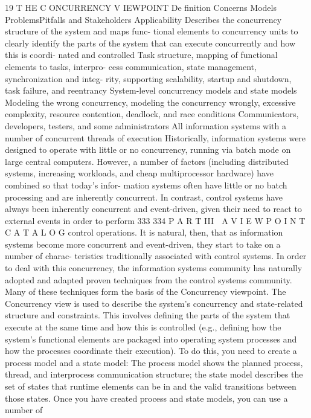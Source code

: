 19
T HE C ONCURRENCY
V IEWPOINT
De finition
Concerns
Models
ProblemsPitfalls
and
Stakeholders
Applicability
Describes the concurrency structure of the system and maps func-
tional elements to concurrency units to clearly identify the parts of
the system that can execute concurrently and how this is coordi-
nated and controlled
Task structure, mapping of functional elements to tasks, interpro-
cess communication, state management, synchronization and integ-
rity, supporting scalability, startup and shutdown, task failure, and
reentrancy
System-level concurrency models and state models
Modeling the wrong concurrency, modeling the concurrency
wrongly, excessive complexity, resource contention, deadlock, and
race conditions
Communicators, developers, testers, and some administrators
All information systems with a number of concurrent threads of
execution
Historically, information systems were designed to operate with little or no
concurrency, running via batch mode on large central computers. However,
a number of factors (including distributed systems, increasing workloads,
and cheap multiprocessor hardware) have combined so that today’s infor-
mation systems often have little or no batch processing and are inherently
concurrent.
In contrast, control systems have always been inherently concurrent and
event-driven, given their need to react to external events in order to perform
333
334
 P A R T III  A V I E W P O I N T C A T A L O G
control operations. It is natural, then, that as information systems become
more concurrent and event-driven, they start to take on a number of charac-
teristics traditionally associated with control systems. In order to deal with
this concurrency, the information systems community has naturally adopted
and adapted proven techniques from the control systems community. Many of
these techniques form the basis of the Concurrency viewpoint.
The Concurrency view is used to describe the system’s concurrency and
state-related structure and constraints. This involves defining the parts of the
system that execute at the same time and how this is controlled (e.g., defining
how the system’s functional elements are packaged into operating system
processes and how the processes coordinate their execution). To do this, you
need to create a process model and a state model: The process model shows
the planned process, thread, and interprocess communication structure; the
state model describes the set of states that runtime elements can be in and the
valid transitions between those states.
Once you have created process and state models, you can use a number of
